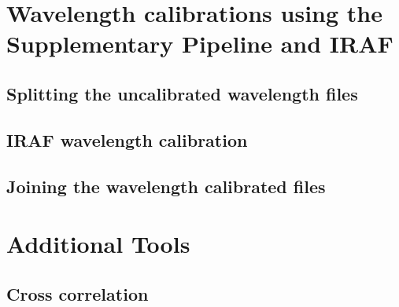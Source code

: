 \section{Wavelength calibrations using the Supplementary Pipeline and IRAF} \label{sec:mod_tools}


\subsection{Splitting the uncalibrated wavelength files}


\subsection{IRAF wavelength calibration}\label{subsec:IRAF_wav_cal}



\subsection{Joining the wavelength calibrated files}


\section{Additional Tools}\label{sec:add_tools}

\subsection{Cross correlation}

